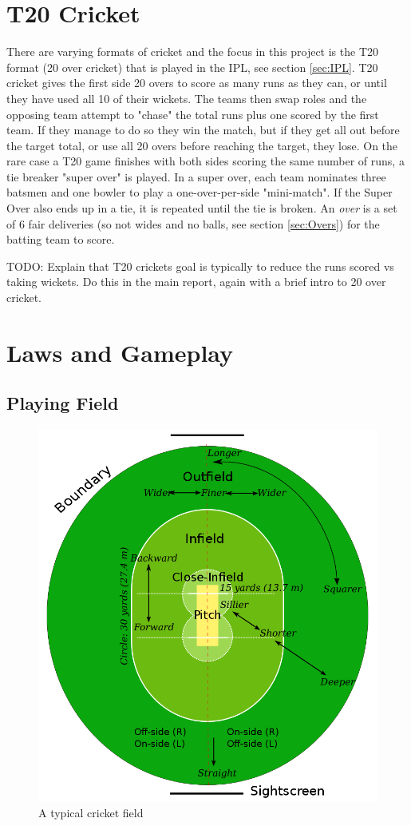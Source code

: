 \documentclass[12pt,a4paper]{report}
\theoremstyle{definition}
\begin{document}
\section{T20 Cricket} \label{sec:T20Cricket}

There are varying formats of cricket and the focus in this project is the T20 format (20 over cricket) that is played in the IPL, see section \ref{sec:IPL}. 
T20 cricket gives the first side 20 overs to score as many runs as they can, or until they have used all 10 of their wickets.
The teams then swap roles and the opposing team attempt to "chase" the total runs plus one scored by the first team. 
If they manage to do so they win the match, but if they get all out before the target total, or use all 20 overs before reaching the target, they lose.
On the rare case a T20 game finishes with both sides scoring the same number of runs, a tie breaker "super over" is played.
In a super over, each team nominates three batsmen and one bowler to play a one-over-per-side "mini-match".
If the Super Over also ends up in a tie, it is repeated until the tie is broken.
An \emph{over} is a set of 6 fair deliveries (so not wides and no balls, see section \ref{sec:Overs}) for the batting team to score.

TODO: Explain that T20 crickets goal is typically to reduce the runs scored vs taking wickets. 
Do this in the main report, again with a brief intro to 20 over cricket. 

\section{Laws and Gameplay}

\subsection{Playing Field}

\begin{figure}[H]
    \centering
    \includegraphics[width=0.8\linewidth]{Cricket_Field.png}
    \caption{A typical cricket field \citep{cricketWiki}}
    \label{fig:CricketField}
\end{figure}
\end{document}
